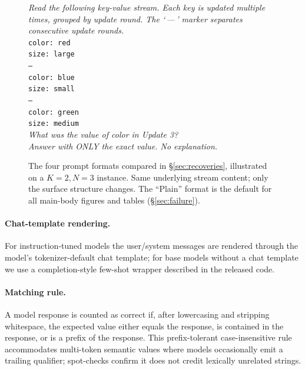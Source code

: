 \documentclass[11pt]{article}
\begin{document}
\begin{figure}[h]
\begin{minipage}[t]{0.48\textwidth}
\begin{tcolorbox}[
    colframe=black!30, colback=gray!4,
    boxrule=0.5pt, arc=2pt,
    left=6pt, right=6pt, top=4pt, bottom=4pt,
    equal height group=fmts,
    title={\textbf{Landmark} (\texttt{landmark})},
    fonttitle=\small\bfseries,
    coltitle=black]
\emph{Read the following key-value stream. Each key is updated
multiple times, grouped by update round. The `\,---\,' marker
separates consecutive update rounds.}\\[4pt]
\texttt{color: red}\\
\texttt{size: large}\\
\texttt{---}\\
\texttt{color: blue}\\
\texttt{size: small}\\
\texttt{---}\\
\texttt{color: green}\\
\texttt{size: medium}\\[4pt]
\emph{What was the value of color in Update 3?}\\
\emph{Answer with ONLY the exact value. No explanation.}
\end{tcolorbox}
\end{minipage}
\caption{The four prompt formats compared in
\S\ref{sec:recoveries}, illustrated on a $K{=}2, N{=}3$ instance.
Same underlying stream content; only the surface structure changes.
The ``Plain'' format is the default for all main-body figures and
tables (\S\ref{sec:failure}).}
\label{fig:prompt_formats}
\end{figure}

\paragraph{Chat-template rendering.}
For instruction-tuned models the user/system messages are rendered
through the model's tokenizer-default chat template; for base
models without a chat template we use a completion-style few-shot
wrapper described in the released code.

\paragraph{Matching rule.}
A model response is counted as correct if, after lowercasing and
stripping whitespace, the expected value either equals the response,
is contained in the response, or is a prefix of the response. This
prefix-tolerant case-insensitive rule accommodates multi-token
semantic values where models occasionally emit a trailing
qualifier; spot-checks confirm it does not credit lexically
unrelated strings.
\end{document}
